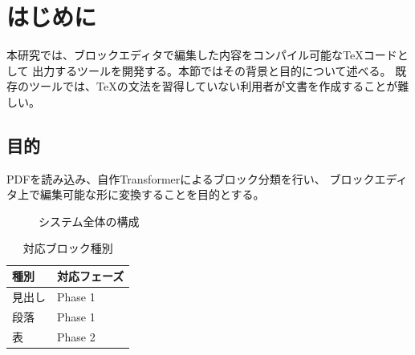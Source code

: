 \documentclass[uplatex,dvipdfmx]{jsarticle}
\begin{document}
\section{はじめに}

本研究では、ブロックエディタで編集した内容をコンパイル可能なTeXコードとして
出力するツールを開発する。本節ではその背景と目的について述べる。
既存のツールでは、TeXの文法を習得していない利用者が文書を作成することが難しい。

\subsection{目的}

PDFを読み込み、自作Transformerによるブロック分類を行い、
ブロックエディタ上で編集可能な形に変換することを目的とする。

\begin{figure}[h]
\centering
\fbox{\rule{0pt}{3cm}\rule{5cm}{0pt}}
\caption{システム全体の構成}
\end{figure}

\begin{table}[h]
\centering
\caption{対応ブロック種別}
\begin{tabular}{|l|l|}
\hline
種別 & 対応フェーズ \\
\hline
見出し & Phase 1 \\
段落 & Phase 1 \\
表 & Phase 2 \\
\hline
\end{tabular}
\end{table}
\end{document}
